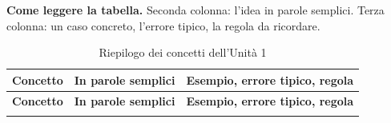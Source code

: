 {\small
\setlength{\tabcolsep}{4pt}
\renewcommand{\arraystretch}{1.2}
\noindent\textbf{Come leggere la tabella.} Seconda colonna: l'idea in parole semplici. Terza colonna: \esem un caso concreto, \attn l'errore tipico, \regl la regola da ricordare.\par\medskip
\begin{longtable}{P{0.15}P{0.36}P{0.40}}
    \caption{Riepilogo dei concetti dell'Unità 1}\\
    \toprule
    \textbf{Concetto} & \textbf{In parole semplici} & \textbf{Esempio, errore tipico, regola}\\
    \endfirsthead
    \toprule
    \textbf{Concetto} & \textbf{In parole semplici} & \textbf{Esempio, errore tipico, regola}\\
    \endhead
    \bottomrule
    \endfoot


\end{longtable}}
